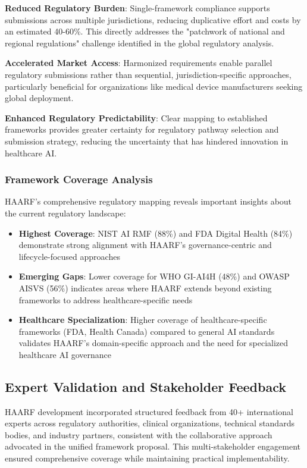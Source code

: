 \documentclass[11pt]{article}
\begin{document}
\textbf{Reduced Regulatory Burden}: Single-framework compliance supports submissions across multiple jurisdictions, reducing duplicative effort and costs by an estimated 40-60\%. This directly addresses the "patchwork of national and regional regulations" challenge identified in the global regulatory analysis.

\textbf{Accelerated Market Access}: Harmonized requirements enable parallel regulatory submissions rather than sequential, jurisdiction-specific approaches, particularly beneficial for organizations like medical device manufacturers seeking global deployment.

\textbf{Enhanced Regulatory Predictability}: Clear mapping to established frameworks provides greater certainty for regulatory pathway selection and submission strategy, reducing the uncertainty that has hindered innovation in healthcare AI.

\subsubsection{Framework Coverage Analysis}

HAARF's comprehensive regulatory mapping reveals important insights about the current regulatory landscape:

\begin{itemize}
    \item \textbf{Highest Coverage}: NIST AI RMF (88\%) and FDA Digital Health (84\%) demonstrate strong alignment with HAARF's governance-centric and lifecycle-focused approaches \cite{nist2023airisk, fda2021aiml}
    \item \textbf{Emerging Gaps}: Lower coverage for WHO GI-AI4H (48\%) and OWASP AISVS (56\%) indicates areas where HAARF extends beyond existing frameworks to address healthcare-specific needs
    \item \textbf{Healthcare Specialization}: Higher coverage of healthcare-specific frameworks (FDA, Health Canada) compared to general AI standards validates HAARF's domain-specific approach and the need for specialized healthcare AI governance
\end{itemize}

\subsection{Expert Validation and Stakeholder Feedback}

HAARF development incorporated structured feedback from 40+ international experts across regulatory authorities, clinical organizations, technical standards bodies, and industry partners, consistent with the collaborative approach advocated in the unified framework proposal. This multi-stakeholder engagement ensured comprehensive coverage while maintaining practical implementability.
\end{document}
